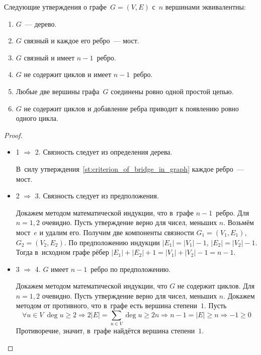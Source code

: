 \begin{theorem}
Следующие утверждения о графе~$G = (V, E)$ с~$n$ вершинами эквивалентны:
\begin{enumerate}
	\item $G$~--- дерево.
	\item $G$ связный и каждое его ребро~--- мост.
	\item $G$ связный и имеет $n - 1$~ребро.
	\item $G$ не содержит циклов и имеет $n - 1$~ребро.
	\item Любые две вершины графа~$G$ соединены ровно одной простой цепью.
	\item $G$ не содержит циклов и добавление ребра приводит к появлению ровно одного цикла.
\end{enumerate}
\end{theorem}
\begin{proof}
\begin{itemize}
	\item 1 $\Rightarrow$ 2.
	Связность следует из определения дерева.
	
	В~силу утверждения~\ref*{st:criterion_of_bridge_in_graph} каждое ребро~--- мост.
	
	\item 2 $\Rightarrow$ 3.
	Связность следует из предположения.
	
	Докажем методом математической индукции, что в~графе $n - 1$~ребро.
	\indbase Для $n = 1, 2$ очевидно.
	\indstep Пусть утверждение верно для чисел, меньших $n$.
	Возьмём мост~$e$ и удалим его.
	Получим две компоненты связности $G_1 = (V_1, E_1)$, $G_2 = (V_2, E_2)$.
	По предположению индукции $|E_1| = |V_1| - 1$, $|E_2| = |V_2| - 1$.
	Тогда в~исходном графе рёбер $|E_1| + |E_2| + 1 = |V_1| + |V_2| - 1 = n - 1$. \indend
	
	\item 3 $\Rightarrow$ 4.
	$G$ имеет $n - 1$~ребро по предположению.
	
	Докажем методом математической индукции, что $G$ не содержит циклов.
	\indbase Для $n = 1, 2$ очевидно.
	\indstep Пусть утверждение верно для чисел, меньших $n$.
	Докажем методом от противного, что в~графе есть вершина степени~$1$.
	Пусть
	\begin{equation*}
	\forall u \in V \ \deg u \geqslant 2 \Rightarrow 2|E| = \sum_{u \in V} \deg u \geqslant 2n \Rightarrow n - 1 = |E| \geqslant n \Rightarrow -1 \geqslant 0
	\end{equation*}
	Противоречие, значит, в~графе найдётся вершина степени~$1$.
	

\end{itemize}
\end{proof}

